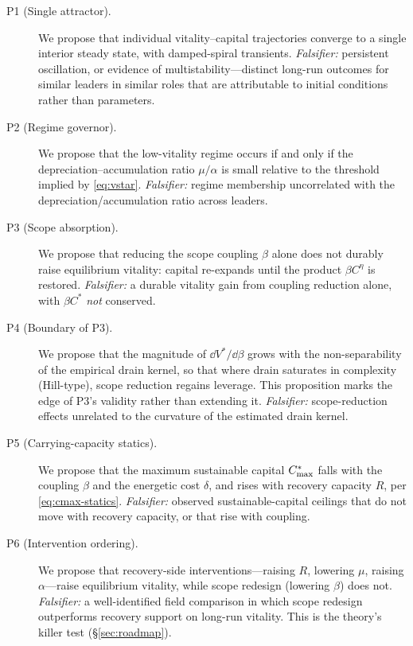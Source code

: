 \begin{description}
\item[P1 (Single attractor).] We propose that individual vitality--capital
trajectories converge to a single interior steady state, with
damped-spiral transients. \emph{Falsifier:} persistent oscillation, or
evidence of multistability---distinct long-run outcomes for similar
leaders in similar roles that are attributable to initial conditions
rather than parameters.

\item[P2 (Regime governor).] We propose that the low-vitality regime
occurs if and only if the depreciation--accumulation ratio $\mu/\alpha$ is
small relative to the threshold implied by \eqref{eq:vstar}.
\emph{Falsifier:} regime membership uncorrelated with the
depreciation/accumulation ratio across leaders.

\item[P3 (Scope absorption).] We propose that reducing the scope coupling
$\beta$ alone does not durably raise equilibrium vitality: capital
re-expands until the product $\beta C^{\eta}$ is restored.
\emph{Falsifier:} a durable vitality gain from coupling reduction alone,
with $\beta C^{*}$ \emph{not} conserved.

\item[P4 (Boundary of P3).] We propose that the magnitude of
$\dd V^{*}/\dd\beta$ grows with the non-separability of the empirical
drain kernel, so that where drain saturates in complexity (Hill-type),
scope reduction regains leverage. This proposition marks the edge of P3's
validity rather than extending it. \emph{Falsifier:} scope-reduction
effects unrelated to the curvature of the estimated drain kernel.

\item[P5 (Carrying-capacity statics).] We propose that the maximum
sustainable capital $C^{*}_{\max}$ falls with the coupling $\beta$ and the
energetic cost $\delta$, and rises with recovery capacity $R$, per
\eqref{eq:cmax-statics}. \emph{Falsifier:} observed sustainable-capital
ceilings that do not move with recovery capacity, or that rise with
coupling.

\item[P6 (Intervention ordering).] We propose that recovery-side
interventions---raising $R$, lowering $\mu$, raising $\alpha$---raise
equilibrium vitality, while scope redesign (lowering $\beta$) does not.
\emph{Falsifier:} a well-identified field comparison in which scope
redesign outperforms recovery support on long-run vitality. This is the
theory's killer test (\S\ref{sec:roadmap}).
\end{description}
